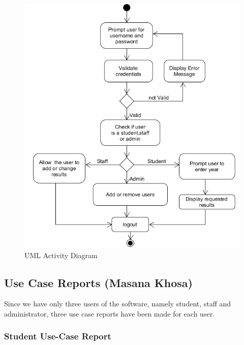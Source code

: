 \documentclass[10pt,onecolumn]{lab}
\begin{document}
\begin{center}
\begin{figure}[h]
\centering
\includegraphics[trim={0cm 0 0 0},clip]{UML-Activity}
\caption{UML Activity Diagram}
\end{figure}
\end{center}

\subsection{Use Case Reports (Masana Khosa)}
Since we have only three users of the software, namely student, staff and administrator, three use case reports have been made for each user. 
 

\clearpage
\subsubsection{Student Use-Case Report}$\;\;\;\;\;\;\;\;\;\;\;\;\;\;\;\;\;\;\;\;\;\;\;$
\end{document}
